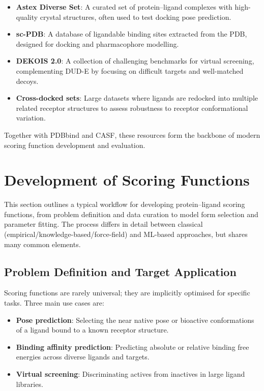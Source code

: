 \documentclass[12pt]{article}
\begin{document}
\begin{itemize}
    \item \textbf{Astex Diverse Set}\cite{CH3_hartshorn2007}: A curated set of protein--ligand complexes with high-quality crystal structures, often used to test docking pose prediction.
    \item \textbf{sc-PDB}\cite{CH3_scPDB2014}: A database of ligandable binding sites extracted from the PDB, designed for docking and pharmacophore modelling.
    \item \textbf{DEKOIS 2.0}\cite{CH3_bauer2013}: A collection of challenging benchmarks for virtual screening, complementing DUD-E by focusing on difficult targets and well-matched decoys.
    \item \textbf{Cross-docked sets}: Large datasets where ligands are redocked into multiple related receptor structures to assess robustness to receptor conformational variation.
\end{itemize}

Together with PDBbind and CASF, these resources form the backbone of modern scoring function development and evaluation.

\section{Development of Scoring Functions}

This section outlines a typical workflow for developing protein--ligand scoring functions, from problem definition and data curation to model form selection and parameter fitting. The process differs in detail between classical (empirical/knowledge-based/force-field) and ML-based approaches, but shares many common elements\cite{CH3_Wang2017}.

\subsection{Problem Definition and Target Application}
Scoring functions are rarely universal; they are implicitly optimised for specific tasks. Three main use cases are:

\begin{itemize}
    \item \textbf{Pose prediction}: Selecting the near native pose or bioactive conformations of a ligand bound to a known receptor structure.
    \item \textbf{Binding affinity prediction}: Predicting absolute or relative binding free energies across diverse ligands and targets.
    \item \textbf{Virtual screening}: Discriminating actives from inactives in large ligand libraries.
\end{itemize}
\end{document}

